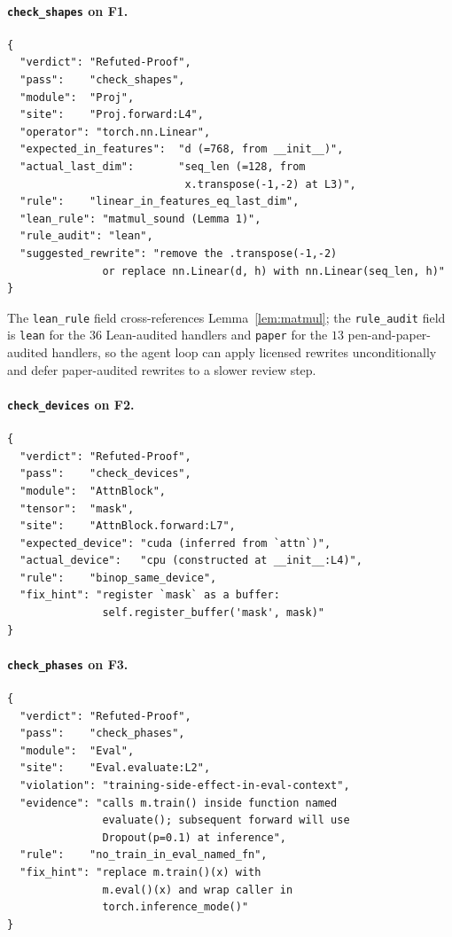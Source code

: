 \documentclass{article}
\begin{document}
\paragraph{\texttt{check\_shapes} on F1.}
\begin{lstlisting}
{
  "verdict": "Refuted-Proof",
  "pass":    "check_shapes",
  "module":  "Proj",
  "site":    "Proj.forward:L4",
  "operator": "torch.nn.Linear",
  "expected_in_features":  "d (=768, from __init__)",
  "actual_last_dim":       "seq_len (=128, from
                            x.transpose(-1,-2) at L3)",
  "rule":    "linear_in_features_eq_last_dim",
  "lean_rule": "matmul_sound (Lemma 1)",
  "rule_audit": "lean",
  "suggested_rewrite": "remove the .transpose(-1,-2)
               or replace nn.Linear(d, h) with nn.Linear(seq_len, h)"
}
\end{lstlisting}
The \texttt{lean\_rule} field cross-references
Lemma~\ref{lem:matmul}; the \texttt{rule\_audit} field is
\texttt{lean} for the $36$ Lean-audited handlers and
\texttt{paper} for the $13$ pen-and-paper-audited handlers, so the
agent loop can apply licensed rewrites unconditionally and
defer paper-audited rewrites to a slower review step.

\paragraph{\texttt{check\_devices} on F2.}
\begin{lstlisting}
{
  "verdict": "Refuted-Proof",
  "pass":    "check_devices",
  "module":  "AttnBlock",
  "tensor":  "mask",
  "site":    "AttnBlock.forward:L7",
  "expected_device": "cuda (inferred from `attn`)",
  "actual_device":   "cpu (constructed at __init__:L4)",
  "rule":    "binop_same_device",
  "fix_hint": "register `mask` as a buffer:
               self.register_buffer('mask', mask)"
}
\end{lstlisting}

\paragraph{\texttt{check\_phases} on F3.}
\begin{lstlisting}
{
  "verdict": "Refuted-Proof",
  "pass":    "check_phases",
  "module":  "Eval",
  "site":    "Eval.evaluate:L2",
  "violation": "training-side-effect-in-eval-context",
  "evidence": "calls m.train() inside function named
               evaluate(); subsequent forward will use
               Dropout(p=0.1) at inference",
  "rule":    "no_train_in_eval_named_fn",
  "fix_hint": "replace m.train()(x) with
               m.eval()(x) and wrap caller in
               torch.inference_mode()"
}
\end{lstlisting}
\end{document}
